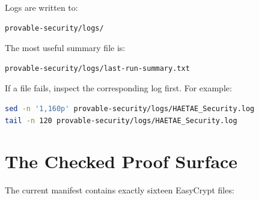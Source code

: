 \documentclass[11pt]{article}
\begin{document}
Logs are written to:

\begin{lstlisting}[language=bash]
provable-security/logs/
\end{lstlisting}

The most useful summary file is:

\begin{lstlisting}[language=bash]
provable-security/logs/last-run-summary.txt
\end{lstlisting}

If a file fails, inspect the corresponding log first.  For example:

\begin{lstlisting}[language=bash]
sed -n '1,160p' provable-security/logs/HAETAE_Security.log
tail -n 120 provable-security/logs/HAETAE_Security.log
\end{lstlisting}

\section{The Checked Proof Surface}

The current manifest contains exactly sixteen EasyCrypt files:
\end{document}
